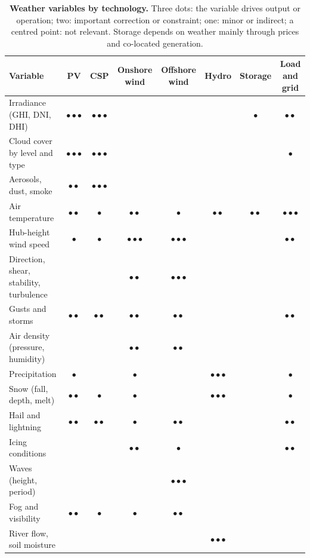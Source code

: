 \newcommand{\impc}{{\color{ewfSeq600}$\bullet\bullet\bullet$}}
\newcommand{\impb}{{\color{ewfSeq400}$\bullet\bullet$}\phantom{$\bullet$}}
\newcommand{\impa}{{\color{ewfSeq300}$\bullet$}\phantom{$\bullet\bullet$}}
\newcommand{\impn}{{\color{ewfAxis}\textperiodcentered}\phantom{$\bullet\bullet$}}
\begin{table}[t]
\centering\small
\caption{\textbf{Weather variables by technology.} Three dots: the variable drives output or operation; two: important correction or constraint; one: minor or indirect; a centred point: not relevant. Storage depends on weather mainly through prices and co-located generation.}
\label{tab:tech}
\setlength{\tabcolsep}{5pt}
\begin{tabular}{@{}lccccccc@{}}
\toprule
Variable & PV & CSP & Onshore wind & Offshore wind & Hydro & Storage & Load and grid \\
\midrule
Irradiance (GHI, DNI, DHI) & \impc & \impc & \impn & \impn & \impn & \impa & \impb \\
Cloud cover by level and type & \impc & \impc & \impn & \impn & \impn & \impn & \impa \\
Aerosols, dust, smoke & \impb & \impc & \impn & \impn & \impn & \impn & \impn \\
Air temperature & \impb & \impa & \impb & \impa & \impb & \impb & \impc \\
Hub-height wind speed & \impa & \impa & \impc & \impc & \impn & \impn & \impb \\
Direction, shear, stability, turbulence & \impn & \impn & \impb & \impc & \impn & \impn & \impn \\
Gusts and storms & \impb & \impb & \impb & \impb & \impn & \impn & \impb \\
Air density (pressure, humidity) & \impn & \impn & \impb & \impb & \impn & \impn & \impn \\
Precipitation & \impa & \impn & \impa & \impn & \impc & \impn & \impa \\
Snow (fall, depth, melt) & \impb & \impa & \impa & \impn & \impc & \impn & \impa \\
Hail and lightning & \impb & \impb & \impa & \impb & \impn & \impn & \impb \\
Icing conditions & \impn & \impn & \impb & \impa & \impn & \impn & \impb \\
Waves (height, period) & \impn & \impn & \impn & \impc & \impn & \impn & \impn \\
Fog and visibility & \impb & \impa & \impa & \impb & \impn & \impn & \impn \\
River flow, soil moisture & \impn & \impn & \impn & \impn & \impc & \impn & \impn \\
\bottomrule
\end{tabular}
\end{table}
